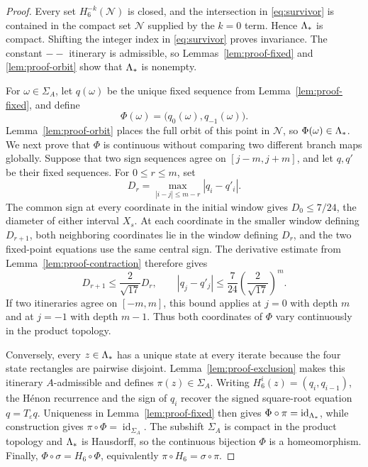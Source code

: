 \begin{proof}
Every set $H_6^{-k}(\mathcal N)$ is closed, and the intersection in
\eqref{eq:survivor} is contained in the compact set $\mathcal N$ supplied by
the $k=0$ term.  Hence $\Lambda_*$ is compact.  Shifting the integer index in
\eqref{eq:survivor} proves invariance.  The constant $--$ itinerary is
admissible, so Lemmas~\ref{lem:proof-fixed} and \ref{lem:proof-orbit} show that
$\Lambda_*$ is nonempty.

For $\omega\in\Sigma_A$, let $q(\omega)$ be the unique fixed sequence from
Lemma~\ref{lem:proof-fixed}, and define
\[
 \Phi(\omega)=\bigl(q_0(\omega),q_{-1}(\omega)\bigr).
\]
Lemma~\ref{lem:proof-orbit} places the full orbit of this point in
$\mathcal N$, so $\Phi(\omega)\in\Lambda_*$.  We next prove that $\Phi$ is
continuous without comparing two different branch maps globally.  Suppose
that two sign sequences agree on $[j-m,j+m]$, and let $q,q'$ be their fixed
sequences.  For $0\leq r\leq m$, set
\[
 D_r=\max_{|i-j|\leq m-r}|q_i-q'_i|.
\]
The common sign at every coordinate in the initial window gives
$D_0\leq 7/24$, the diameter of either interval $X_s$.  At each coordinate in
the smaller window defining $D_{r+1}$, both neighboring coordinates lie in
the window defining $D_r$, and the two fixed-point equations use the same
central sign.  The derivative estimate from
Lemma~\ref{lem:proof-contraction} therefore gives
\[
 D_{r+1}\leq \frac2{\sqrt{17}}D_r,
 \qquad
 |q_j-q'_j|\leq \frac7{24}
 \left(\frac2{\sqrt{17}}\right)^m.
\]
If two itineraries agree on $[-m,m]$, this bound applies at $j=0$ with depth
$m$ and at $j=-1$ with depth $m-1$.  Thus both coordinates of $\Phi$ vary
continuously in the product topology.

Conversely, every $z\in\Lambda_*$ has a unique state at every iterate because
the four state rectangles are pairwise disjoint.
Lemma~\ref{lem:proof-exclusion} makes
this itinerary $A$-admissible and defines $\pi(z)\in\Sigma_A$.  Writing
$H_6^i(z)=(q_i,q_{i-1})$, the H\'enon recurrence and the sign of $q_i$ recover
the signed square-root equation $q=T_\varepsilon q$.  Uniqueness in
Lemma~\ref{lem:proof-fixed} then gives
$\Phi\circ\pi=\operatorname{id}_{\Lambda_*}$, while construction gives
$\pi\circ\Phi=\operatorname{id}_{\Sigma_A}$.  The subshift $\Sigma_A$ is
compact in the product topology and $\Lambda_*$ is Hausdorff, so the continuous
bijection $\Phi$ is a homeomorphism.  Finally,
$\Phi\circ\sigma=H_6\circ\Phi$, equivalently
$\pi\circ H_6=\sigma\circ\pi$.
\end{proof}

